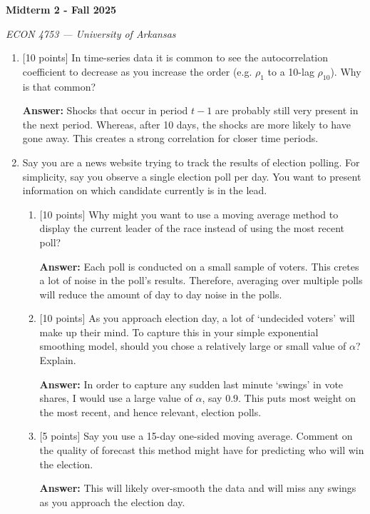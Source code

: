 \documentclass[12pt]{article}
\newcommand{\answer}[1]{{\color{blue_winged_teal}\textbf{Answer:} #1}}
\newcommand{\pts}[1]{{\color{zinc500}[#1 points]}}
\begin{document}
\begin{center}
  {\Huge\bf Midterm 2 - Fall 2025}
  
  \smallskip
  {\large\it ECON 4753 — University of Arkansas}
\end{center}

\vspace{5mm}
\begin{enumerate}
  \item \pts{10} In time-series data it is common to see the autocorrelation coefficient to decrease as you increase the order (e.g. $\rho_1$ to a 10-lag $\rho_{10}$). 
  Why is that common?

  \answer{
    Shocks that occur in period $t-1$ are probably still very present in the next period. 
    Whereas, after 10 days, the shocks are more likely to have gone away.
    This creates a strong correlation for closer time periods. 
  }
  
  \bigskip
  \item Say you are a news website trying to track the results of election polling. 
  For simplicity, say you observe a single election poll per day. 
  You want to present information on which candidate currently is in the lead.

  \medskip
  \begin{enumerate}[label=(\alph*)]
    \item \pts{10} Why might you want to use a moving average method to display the current leader of the race instead of using the most recent poll?
    
    \answer{
      Each poll is conducted on a small sample of voters. 
      This cretes a lot of noise in the poll's results. 
      Therefore, averaging over multiple polls will reduce the amount of day to day noise in the polls.
    }

    \item \pts{10} As you approach election day, a lot of `undecided voters' will make up their mind. 
    To capture this in your simple exponential smoothing model, should you chose a relatively large or small value of $\alpha$? 
    Explain.

    \answer{
      In order to capture any sudden last minute `swings' in vote shares, I would use a large value of $\alpha$, say $0.9$. 
      This puts most weight on the most recent, and hence relevant, election polls.
    }

    \item \pts{5} Say you use a 15-day one-sided moving average. Comment on the quality of forecast this method might have for predicting who will win the election.
    
    \answer{
      This will likely over-smooth the data and will miss any swings as you approach the election day.
    }
  \end{enumerate}

\end{enumerate}
\end{document}
